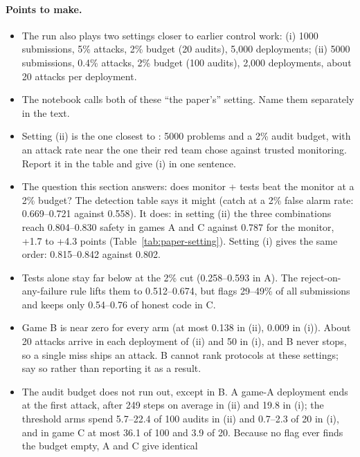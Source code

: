 \paragraph{Points to make.}
\begin{itemize}
  \item The run also plays two settings closer to earlier control work: (i) 1000
        submissions, 5\% attacks, 2\% budget (20 audits), 5{,}000 deployments;
        (ii) 5000 submissions, 0.4\% attacks, 2\% budget (100 audits), 2{,}000
        deployments, about 20 attacks per deployment.
  \item The notebook calls both of these ``the paper's'' setting. Name them
        separately in the text.
  \item Setting (ii) is the one closest to \citet{greenblatt2024control}: 5000
        problems and a 2\% audit budget, with an attack rate near the one their
        red team chose against trusted monitoring. Report it in the table and
        give (i) in one sentence.
  \item The question this section answers: does monitor + tests beat the
        monitor at a 2\% budget? The detection table says it might (catch at a
        2\% false alarm rate: 0.669--0.721 against 0.558). It does: in setting
        (ii) the three combinations reach 0.804--0.830 safety in games A and C
        against 0.787 for the monitor, +1.7 to +4.3 points
        (Table~\ref{tab:paper-setting}). Setting (i) gives the same order:
        0.815--0.842 against 0.802.
  \item Tests alone stay far below at the 2\% cut (0.258--0.593 in A). The
        reject-on-any-failure rule lifts them to 0.512--0.674, but flags
        29--49\% of all submissions and keeps only 0.54--0.76 of honest code
        in C.
  \item Game B is near zero for every arm (at most 0.138 in (ii), 0.009 in
        (i)). About 20 attacks arrive in each deployment of (ii) and 50 in (i),
        and B never stops, so a single miss ships an attack. B cannot rank
        protocols at these settings; say so rather than reporting it as a
        result.
  \item The audit budget does not run out, except in B. A game-A deployment
        ends at the first attack, after 249 steps on average in (ii) and 19.8 in
        (i); the threshold arms spend 5.7--22.4 of 100 audits in (ii) and
        0.7--2.3 of 20 in (i), and in game C at most 36.1 of 100 and 3.9 of
        20.
        Because no flag ever finds the budget empty, A and C give identical

\end{itemize}
